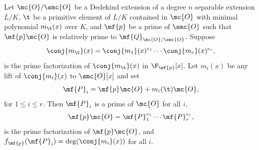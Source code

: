     \begin{theorem*}
      Let \(\mc{O}/\smc{O}\) be a Dedekind extension of a degree \(n\) separable extension \(L/K\), \(\t\) be a primitive element of \(L/K\) contained in \(\mc{O}\) with minimal polynomial \(m_{\t}(x)\) over \(K\), and \(\mf{p}\) be a prime of \(\smc{O}\) such that \(\mf{p}\mc{O}\) is relatively prime to \(\mf{Q}_{\mc{O}/\smc{O}}\). Suppose
      \[
        \conj{m_{\t}}(x) = \conj{m_{1}}(x)^{e_{1}} \cdots \conj{m_{r}}(x)^{e_{r}},
      \]
      is the prime factorization of \(\conj{m_{\t}}(x)\) in \(\F_{\mf{p}}[x]\). Let \(m_{i}(x)\) be any lift of \(\conj{m_{i}}(x)\) to \(\smc{O}[x]\) and set
      \[
        \mf{P}_{i} = \mf{p}\mc{O}+m_{i}(\t)\mc{O},
      \]
      for \(1 \le i \le r\). Then \(\mf{P}_{i}\) is a prime of \(\mc{O}\) for all \(i\),
      \[
        \mf{p}\mc{O} = \mf{P}_{1}^{e_{1}} \cdots \mf{P}_{r}^{e_{r}},
      \]
      is the prime factorization of \(\mf{p}\mc{O}\), and \(f_{\mf{p}}(\mf{P}_{i}) = \deg(\conj{m_{i}}(x))\) for all \(i\).
    \end{theorem*}
